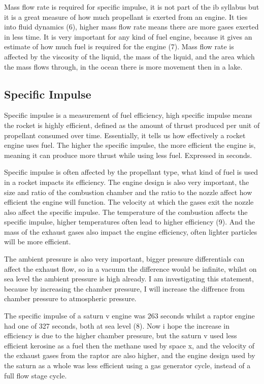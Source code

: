 \documentclass[12pt,a4paper]{article}
\begin{document}
Mass flow rate is required for specific impulse, it is not part of the ib syllabus but it is a great measure of how much propellant is exerted from an engine. It ties into fluid dynamics (6), higher mass flow rate means there are more gases exerted in less time. It is very important for any kind of fuel engine, because it gives an estimate of how much fuel is required for the engine (7). Mass flow rate is affected by the viscosity of the liquid, the mass of the liquid, and the area which the mass flows through, in the ocean there is more movement then in a lake.

\subsection{Specific Impulse}

Specific impulse is a measurement of fuel efficiency, high specific impulse means the rocket is highly efficient, defined as the amount of thrust produced per unit of propellant consumed over time. Essentially, it tells us how effectively a rocket engine uses fuel. The higher the specific impulse, the more efficient the engine is, meaning it can produce more thrust while using less fuel. Expressed in seconds.

Specific impulse is often affected by the propellant type, what kind of fuel is used in a rocket impacts its efficiency. The engine design is also very important, the size and ratio of the combustion chamber and the ratio to the nozzle affect how efficient the engine will function. The velocity at which the gases exit the nozzle also affect the specific impulse. The temperature of the combustion affects the specific impulse, higher temperatures often lead to higher efficiency (9). And the mass of the exhaust gases also impact the engine efficiency, often lighter particles will be more efficient.

The ambient pressure is also very important, bigger pressure differentials can affect the exhaust flow, so in a vacuum the difference would be infinite, whilst on sea level the ambient pressure is high already. I am investigating this statement, because by increasing the chamber pressure, I will increase the diffrence from chamber pressure to atmospheric pressure. 

The specific impulse of a saturn v engine was 263 seconds whilst a raptor engine had one of 327 seconds, both at sea level (8). Now i hope the increase in efficiency is due to the higher chamber pressure, but the saturn v used less efficient kerosine as a fuel then the methane used by space x, and the velocity of the exhaust gases from the raptor are also higher, and the engine design used by the saturn as a whole was less efficient using a gas generator cycle, instead of a full flow stage cycle.
\end{document}
